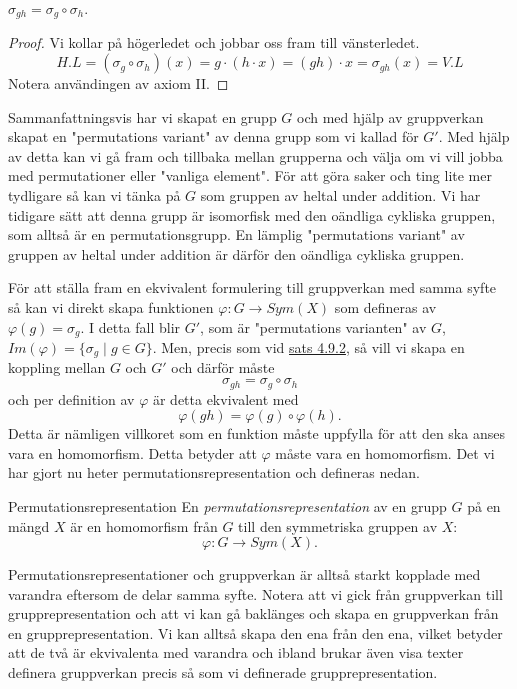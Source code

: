 \documentclass{article}
\theoremstyle{definition}
\begin{document}
\hypertarget{sats.4.9.2}{}
\begin{mytheo}{}{}
  $\sigma_{gh} = \sigma_g \circ \sigma_h$.
\end{mytheo}
\begin{proof}
  Vi kollar på högerledet och jobbar oss fram till vänsterledet.
  \[H.L = (\sigma_g \circ \sigma_h)(x) = g \cdot (h \cdot x) = (gh) \cdot x = \sigma_{gh}(x) = V.L\]
  Notera användingen av axiom II.
\end{proof}

Sammanfattningsvis har vi skapat en grupp $G$ och med hjälp av gruppverkan 
skapat en "permutations variant" av denna grupp som vi kallad för $G'$. Med hjälp av 
detta kan vi gå fram och tillbaka mellan grupperna och välja om vi vill jobba 
med permutationer eller "vanliga element". För att göra saker och ting lite mer tydligare 
så kan vi tänka på $G$ som gruppen av heltal under addition. Vi har tidigare sätt 
att denna grupp är isomorfisk med den oändliga cykliska gruppen, som alltså är en 
permutationsgrupp. En lämplig "permutations variant" av gruppen av heltal under addition 
är därför den oändliga cykliska gruppen. 

För att ställa fram en ekvivalent formulering till gruppverkan med samma syfte 
så kan vi direkt skapa funktionen
$\varphi: G \rightarrow Sym(X)$
som defineras av $\varphi(g) = \sigma_g$.
I detta fall blir $G'$, som är "permutations varianten" av $G$, $Im(\varphi) = 
\{\sigma_g \; | \; g \in G\}$. Men, precis som vid \hyperlink{sats.4.9.2}{sats 4.9.2}, så 
vill vi skapa en koppling mellan $G$ och $G'$ och därför måste 
\[\sigma_{gh} = \sigma_g \circ \sigma_h\]
och per definition av $\varphi$ är detta ekvivalent med 
\[\varphi(gh) = \varphi(g) \circ \varphi(h).\]
Detta är nämligen villkoret som 
en funktion måste uppfylla för att den ska anses vara en homomorfism. Detta betyder att 
$\varphi$ måste vara en homomorfism. Det vi har gjort nu heter 
permutationsrepresentation och defineras nedan.

\begin{mydef}{Permutationsrepresentation}{}
  En \textit{permutationsrepresentation} av en grupp $G$ på en mängd $X$ 
  är en homomorfism från $G$ till den symmetriska gruppen av $X$:
  \[\varphi: G \rightarrow Sym(X).\]
\end{mydef}

Permutationsrepresentationer och gruppverkan är alltså starkt kopplade med varandra 
eftersom de delar samma syfte. Notera att vi gick från gruppverkan till grupprepresentation
och att vi kan gå baklänges och skapa en gruppverkan från en grupprepresentation. 
Vi kan alltså skapa den ena från den ena, vilket betyder att de två är ekvivalenta med varandra
och ibland brukar även visa texter definera gruppverkan precis så som vi definerade 
grupprepresentation.
\end{document}
